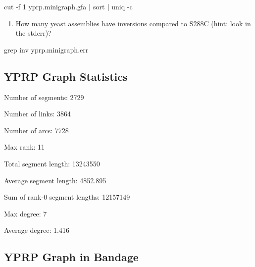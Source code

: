 \documentclass[
]{book}
\newenvironment{Shaded}{\begin{snugshade}}{\end{snugshade}}
\newcommand{\AttributeTok}[1]{\textcolor[rgb]{0.77,0.63,0.00}{#1}}
\newcommand{\BuiltInTok}[1]{#1}
\newcommand{\ExtensionTok}[1]{#1}
\newcommand{\FunctionTok}[1]{\textcolor[rgb]{0.00,0.00,0.00}{#1}}
\newcommand{\KeywordTok}[1]{\textcolor[rgb]{0.13,0.29,0.53}{\textbf{#1}}}
\newcommand{\NormalTok}[1]{#1}
\newcommand{\OperatorTok}[1]{\textcolor[rgb]{0.81,0.36,0.00}{\textbf{#1}}}
\newcommand{\VariableTok}[1]{\textcolor[rgb]{0.00,0.00,0.00}{#1}}
\providecommand{\tightlist}{%
  \setlength{\itemsep}{0pt}\setlength{\parskip}{0pt}}
\begin{document}
\begin{Shaded}
\begin{Highlighting}[]
\FunctionTok{cut} \AttributeTok{{-}f}\NormalTok{ 1 yprp.minigraph.gfa }\KeywordTok{|} \FunctionTok{sort} \KeywordTok{|} \FunctionTok{uniq} \AttributeTok{{-}c}
\end{Highlighting}
\end{Shaded}

\begin{enumerate}
\def\labelenumi{\arabic{enumi}.}
\setcounter{enumi}{2}
\tightlist
\item
  How many yeast assemblies have inversions compared to S288C (hint: look in the stderr)?
\end{enumerate}

\begin{Shaded}
\begin{Highlighting}[]
\FunctionTok{grep}\NormalTok{ inv yprp.minigraph.err}
\end{Highlighting}
\end{Shaded}

\hypertarget{yprp-graph-statistics}{%
\subsection*{YPRP Graph Statistics}\label{yprp-graph-statistics}}

\begin{Shaded}
\end{Shaded}

Number of segments: 2729

Number of links: 3864

Number of arcs: 7728

Max rank: 11

Total segment length: 13243550

Average segment length: 4852.895

Sum of rank-0 segment lengths: 12157149

Max degree: 7

Average degree: 1.416

\hypertarget{yprp-graph-in-bandage}{%
\subsection*{YPRP Graph in Bandage}\label{yprp-graph-in-bandage}}
\end{document}
